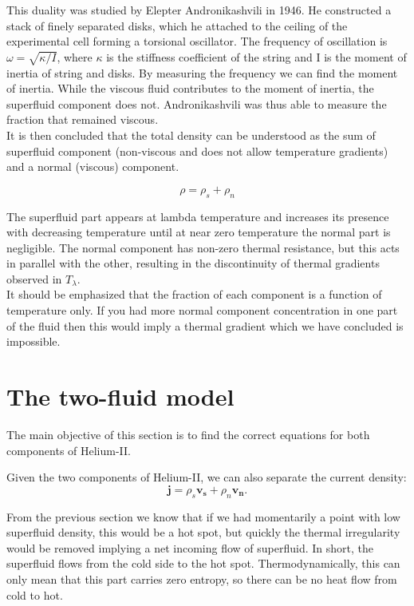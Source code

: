 \documentclass{article}
\begin{document}
This duality was studied by Elepter Andronikashvili in 1946. He constructed a stack of finely separated disks, which he attached to the ceiling of the experimental cell forming a torsional oscillator. The frequency of oscillation is $\omega = \sqrt{\kappa/I}$, where $\kappa$ is the stiffness coefficient of the string and I is the moment of inertia of string and disks. By measuring the frequency we can find the moment of inertia. While the viscous fluid contributes to the moment of inertia, the superfluid component does not. Andronikashvili was thus able to measure the fraction that remained viscous.
\\

It is then concluded that the total density can be understood as the sum of superfluid component (non-viscous and does not allow temperature gradients) and a normal (viscous) component.

\[\rho = \rho_s + \rho_n\]

The superfluid part appears at lambda temperature and increases its presence with decreasing temperature until at near zero temperature the normal part is negligible. The normal component has non-zero thermal resistance, but this acts in parallel with the other, resulting in the discontinuity of thermal gradients observed in $T_\lambda$.
\\

It should be emphasized that the fraction of each component is a function of temperature only. If you had more normal component concentration in one part of the fluid then this would imply a thermal gradient which we have concluded is impossible.
\\

\section{The two-fluid model}


The main objective of this section is to find the correct equations for both components of Helium-II.

Given the two components of Helium-II, we can also separate the current density:
\[\mathbf{j} = \rho_s \mathbf{v_s}+\rho_n \mathbf{v_n}\text{.}\]

From the previous section we know that if we had momentarily a point with low superfluid density, this would be a hot spot, but quickly the thermal irregularity would be removed implying a net incoming flow of superfluid. In short, the superfluid flows from the cold side to the hot spot. Thermodynamically, this can only mean that this part carries zero entropy, so there can be no heat flow from cold to hot.
\\
\end{document}
